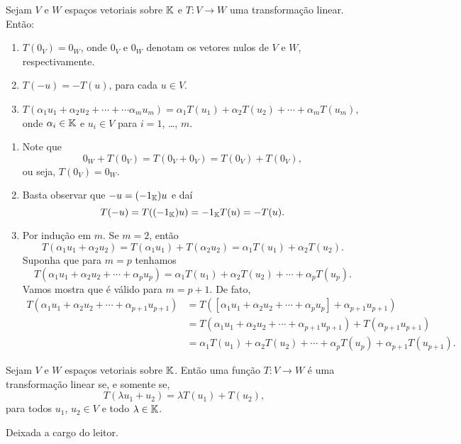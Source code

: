 \begin{lema}
  Sejam $V$ e $W$ espaços vetoriais sobre $\mathbb{K}$ e $T \colon V \to W$ uma transformação linear. Então:
  \begin{enumerate}[label={\roman*})]\label{transformacao_linear_propriedades_basicas}
    \item $T(0_V) = 0_W$, onde $0_V$ e $0_W$ denotam os vetores nulos de $V$ e $W$, respectivamente.

    \item $T(-u) = -T(u)$, para cada $u \in V$.

    \item $T(\alpha_1u_1 + \alpha_2u_2 + \cdots + \cdots \alpha_mu_m) = \alpha_1 T(u_1) + \alpha_2 T(u_2) + \cdots + \alpha_mT(u_m)$, onde $\alpha_i \in \mathbb{K}$ e $u_i \in V$ para $i = 1$, \dots, $m$.
  \end{enumerate}
\end{lema}
\begin{prova}
  \begin{enumerate}[label={\roman*})]
    \item Note que
    \[
      0_W + T(0_V) = T(0_V + 0_V) = T(0_V) + T(0_V),
    \]
    ou seja, $T(0_V) = 0_W$.

    \item Basta observar que $-u = (-1_{\mathbb{K}})u$ e daí
    \[
      T(-u) = T((-1_{\mathbb{K}})u) = -1_{\mathbb{K}}T(u) = -T(u).
    \]

    \item Por indução em $m$. Se $m = 2$, então
    \[
      T(\alpha_1u_1 + \alpha_2u_2) = T(\alpha_1u_1) + T(\alpha_2u_2) = \alpha_1T(u_1) + \alpha_2T(u_2).
    \]
    Suponha que para $m = p$ tenhamos
    \[
      T(\alpha_1u_1 + \alpha_2u_2 + \cdots + \alpha_pu_p) = \alpha_1T(u_1) + \alpha_2T(u_2) + \cdots + \alpha_pT(u_p).
    \]
    Vamos mostra que é válido para $m = p + 1$. De fato,
    \begin{align*}
      T(\alpha_1u_1 + \alpha_2u_2 + \cdots + \alpha_{p + 1}u_{p + 1}) &= T([\alpha_1u_1 + \alpha_2u_2 + \cdots + \alpha_pu_p] + \alpha_{p + 1}u_{p + 1}) \\ &= T(\alpha_1u_1 + \alpha_2u_2 + \cdots + \alpha_{p + 1}u_{p + 1}) + T(\alpha_{p+1}u_{p+1}) \\ &= \alpha_1T(u_1) + \alpha_2T(u_2) + \cdots + \alpha_pT(u_p) + \alpha_{p+1}T(u_{p+1}).
    \end{align*}
  \end{enumerate}
\end{prova}

\begin{lema}\label{condicaoalternativaTL}
    Sejam $V$ e $W$ espaços vetoriais sobre $\mathbb{K}$. Então uma função $T \colon V \to W$ é uma transformação linear se, e somente se,
    \[
    T(\lambda u_1 + u_2) = \lambda T(u_1) + T(u_2),
    \]
    para todos $u_1$, $u_2 \in V$ e todo $\lambda \in \mathbb{K}$.
\end{lema}
\begin{prova}
    Deixada a cargo do leitor.
\end{prova}

